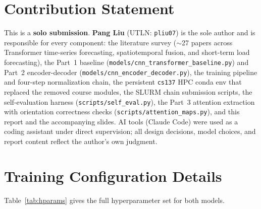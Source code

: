 \documentclass[11pt,letterpaper]{article}
\begin{document}
\section{Contribution Statement}
\label{sec:contrib}

This is a \textbf{solo submission}. \textbf{Pang Liu} (UTLN: \texttt{pliu07}) is the sole author and is responsible for every component: the literature survey ($\sim$27 papers across Transformer time-series forecasting, spatiotemporal fusion, and short-term load forecasting), the Part~1 baseline (\texttt{models/cnn\_transformer\_baseline.py}) and Part~2 encoder-decoder (\texttt{models/cnn\_encoder\_decoder.py}), the training pipeline and four-step normalization chain, the persistent \texttt{cs137} HPC conda env that replaced the removed course modules, the SLURM chain submission scripts, the self-evaluation harness (\texttt{scripts/self\_eval.py}), the Part~3 attention extraction with orientation correctness checks (\texttt{scripts/attention\_maps.py}), and this report and the accompanying slides. AI tools (Claude Code) were used as a coding assistant under direct supervision; all design decisions, model choices, and report content reflect the author's own judgment.




\appendix

\section{Training Configuration Details}
\label{app:hparams}

Table~\ref{tab:hparams} gives the full hyperparameter set for both models.
\end{document}

